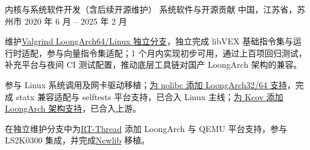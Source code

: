 \begin{cventries}
\cventry
  {内核与系统软件开发（含后续开源维护）}
  {系统软件与开源贡献}
  {中国，江苏省，苏州市}
  {2020 年 6 月 -- 2025 年 2 月}
  {
    \begin{cvitems}
      \item {维护\href{https://github.com/FreeFlyingSheep/valgrind-loongarch64}{Valgrind LoongArch64/Linux 独立分支}，独立完成 libVEX 基础指令集与运行时适配，参与向量指令集适配；1 个月内实现初步可用，通过上百项回归测试，补充平台与夜间 CI 测试配置，推动底层工具链对国产 LoongArch 架构的兼容。}
      \item {参与 Linux 系统调用及网卡驱动移植；\href{https://github.com/FreeFlyingSheep/linux/commit/73f12c6da77a7c25cf0a8f1a3c282db2a1e2bd93}{为 nolibc 添加 LoongArch32/64 支持}，完成 statx 兼容适配与 selftests 平台支持，已合入 Linux 主线；\href{https://github.com/FreeFlyingSheep/kcov/commit/02bc582371c5ff5f4b4781975c2c12f9744b4162}{为 Kcov 添加 LoongArch 架构支持}，已合入上游。}
      \item {在独立维护分支中为\href{https://github.com/FreeFlyingSheep/rt-thread}{RT-Thread} 添加 LoongArch 与 QEMU 平台支持，参与 LS2K0300 集成，并完成\href{https://github.com/FreeFlyingSheep/newlib}{Newlib} 移植。}
    \end{cvitems}
  }

\end{cventries}
